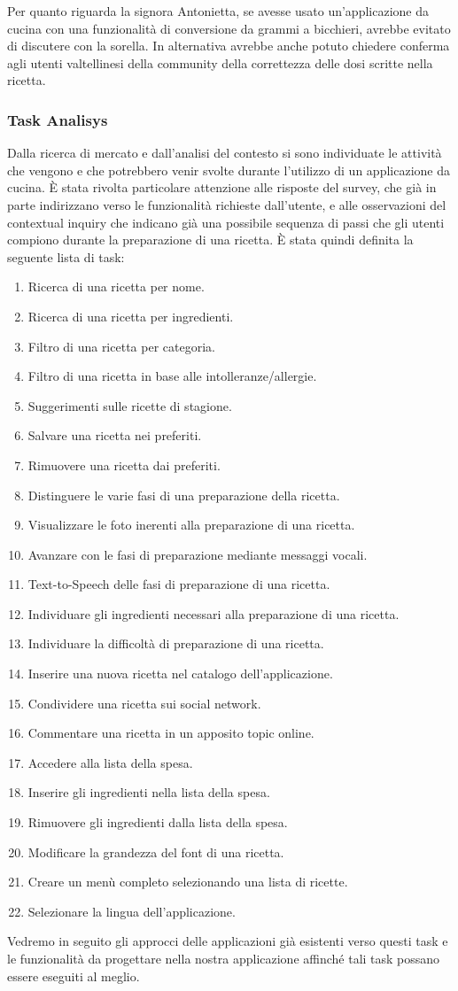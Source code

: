 Per quanto riguarda la signora Antonietta, se avesse usato un'applicazione 
da cucina con una funzionalità di conversione da grammi a
bicchieri, avrebbe evitato di discutere con la sorella. In
alternativa avrebbe anche potuto chiedere conferma agli
utenti valtellinesi della community della correttezza delle dosi scritte
nella ricetta.

\subsubsection{Task Analisys}
Dalla ricerca di mercato e dall'analisi del contesto si sono individuate
le attività che vengono e che potrebbero venir svolte durante l'utilizzo
di un applicazione da cucina. È stata rivolta particolare attenzione
alle risposte del survey, che già in parte indirizzano verso le
funzionalità richieste dall'utente, e alle osservazioni del contextual
inquiry che indicano già una possibile sequenza di passi che gli utenti
compiono durante la preparazione di una ricetta.
È stata quindi definita la seguente lista di task:
\begin{enumerate}
\label{tasks}
\item Ricerca di una ricetta per nome.
\item Ricerca di una ricetta per ingredienti.
\item Filtro di una ricetta per categoria.
\item Filtro di una ricetta in base alle intolleranze/allergie.
\item Suggerimenti sulle ricette di stagione.
\item Salvare una ricetta nei preferiti.
\item Rimuovere una ricetta dai preferiti.
\item Distinguere le varie fasi di una preparazione della ricetta.
\item Visualizzare le foto inerenti alla preparazione di
una ricetta.
\item Avanzare con le fasi di preparazione mediante messaggi vocali.
\item Text-to-Speech delle fasi di preparazione di una ricetta.
\item Individuare gli ingredienti necessari alla preparazione di una
ricetta.
\item Individuare la difficoltà di preparazione di una ricetta.
\item Inserire una nuova ricetta nel catalogo dell'applicazione.
\item Condividere una ricetta sui social network.
\item Commentare una ricetta in un apposito topic online.
\item Accedere alla lista della spesa.
\item Inserire gli ingredienti nella lista della spesa.
\item Rimuovere gli ingredienti dalla lista della spesa.
\item Modificare la grandezza del font di una ricetta.
\item Creare un menù completo selezionando una lista di ricette.
\item Selezionare la lingua dell'applicazione.
\end{enumerate}

Vedremo in seguito gli approcci delle applicazioni già esistenti verso
questi task e le funzionalità da progettare nella nostra applicazione
affinché tali task possano essere eseguiti al meglio.
